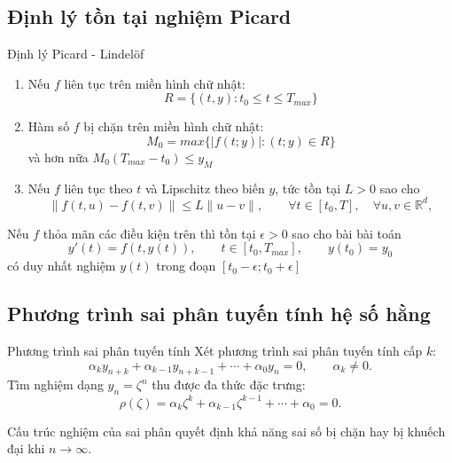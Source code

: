 \documentclass[aspectratio=43]{beamer}
\begin{document}
\subsection*{Định lý tồn tại nghiệm Picard}
\begin{frame}

\begin{baitapbox}{Định lý Picard - Lindelöf}
    \begin{enumerate}
        \item Nếu $f$ liên tục trên miền hình chữ nhật:
        \[
        R = \{(t,y): t_0 \le t \le T_{max}\}
        \]
        \item Hàm số $f$ bị chặn trên miền hình chữ nhật:
        \[
        M_0 =max\{|f(t;y)|:(t;y) \in R\}
        \]
        và hơn nữa $M_0(T_{max} - t_0) \le y_M$
        \item Nếu $f$ liên tục theo $t$ và Lipschitz theo biến $y$, tức tồn tại $L > 0$ sao cho
        \[
        \|f(t, u) - f(t, v)\| \le L\|u - v\|, \qquad \forall t \in [t_0, T], \quad \forall u, v \in \mathbb{R}^d,
        \]
    \end{enumerate}
   
\end{baitapbox}
\end{frame}

\begin{frame}
     Nếu $f$ thỏa mãn các điều kiện trên thì tồn tại $\epsilon > 0$ sao cho bài bài toán
    \[
    y'(t) = f(t, y(t)), \qquad t \in [t_0, T_{max}], \qquad y(t_0) = y_0
    \]
    có duy nhất nghiệm $y(t)$ trong đoạn $[t_0-\epsilon;t_0+\epsilon]$
\end{frame}
\subsection*{Phương trình sai phân tuyến tính hệ số hằng}
\begin{frame}
\begin{baitapbox}{Phương trình sai phân tuyến tính}
Xét phương trình sai phân tuyến tính cấp $k$:
\[
 \alpha_k y_{n+k}+\alpha_{k-1}y_{n+k-1}+\cdots+\alpha_0y_n=0,
 \qquad \alpha_k\ne0.
\]
Tìm nghiệm dạng $y_n=\zeta^n$ thu được đa thức đặc trưng:
\[
 \rho(\zeta)=\alpha_k\zeta^k+\alpha_{k-1}\zeta^{k-1}+\cdots+\alpha_0=0.
\]
\end{baitapbox}
\begin{tcolorbox}[title={Ý nghĩa}, colback=softgreen, colframe=tealgreen, colbacktitle=tealgreen]
Cấu trúc nghiệm của sai phân quyết định khả năng sai số bị chặn hay bị khuếch đại khi $n\to\infty$.
\end{tcolorbox}
\end{frame}
\end{document}
